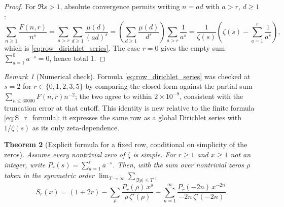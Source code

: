 \documentclass[11pt]{amsart}
\numberwithin{equation}{section}
\theoremstyle{plain}
\newtheorem{theorem}{Theorem}[section]
\theoremstyle{definition}
\theoremstyle{remark}
\newtheorem{remark}[theorem]{Remark}
\newcommand{\mob}{\mu}
\newcommand{\zetaR}{\zeta}
\newcommand{\Fsurf}{F}
\begin{document}
\begin{proof}
For \(\Re s>1\), absolute convergence permits writing \(n=ad\) with \(a>r\), \(d\ge1\):
\begin{equation}
\sum_{n\ge1}\frac{\Fsurf(n,r)}{n^s}
=\sum_{a>r}\sum_{d\ge1}\frac{\mob(d)}{(ad)^s}
=\left(\sum_{d\ge1}\frac{\mob(d)}{d^s}\right)\sum_{a>r}\frac1{a^s}
=\frac1{\zetaR(s)}\left(\zetaR(s)-\sum_{a=1}^r\frac1{a^s}\right),
\label{eq:row_dirichlet_proof}
\end{equation}
which is \eqref{eq:row_dirichlet_series}.  The case \(r=0\) gives the empty sum \(\sum_{a=1}^0a^{-s}=0\), hence total \(1\).
\end{proof}

\begin{remark}[Numerical check]
\label{rem:row_dirichlet_numeric}
Formula \eqref{eq:row_dirichlet_series} was checked at \(s=2\) for \(r\in\{0,1,2,3,5\}\) by comparing the closed form against the partial sum \(\sum_{n\le30000}\Fsurf(n,r)n^{-2}\); the two agree to within \(2\times10^{-8}\), consistent with the truncation error at that cutoff.  This identity is new relative to the finite formula \eqref{eq:S_r_formula}: it expresses the same row as a global Dirichlet series with \(1/\zetaR(s)\) as its only zeta-dependence.
\end{remark}

\begin{theorem}[Explicit formula for a fixed row, conditional on simplicity of the zeros]
\label{thm:explicit_formula_Sr}
Assume every nontrivial zero of \(\zetaR\) is simple.  For \(r\ge1\) and \(x\ge1\) not an integer, write \(P_r(s)=\sum_{a=1}^r a^{-s}\).  Then, with the sum over nontrivial zeros \(\rho\) taken in the symmetric order \(\lim_{T\to\infty}\sum_{|\Im\rho|\le T}\),
\begin{equation}
S_r(x)=(1+2r)-\sum_{\rho}\frac{P_r(\rho)\,x^\rho}{\rho\,\zetaR'(\rho)}-\sum_{n=1}^\infty\frac{P_r(-2n)\,x^{-2n}}{-2n\,\zetaR'(-2n)}.
\label{eq:explicit_formula_Sr}
\end{equation}
\end{theorem}
\end{document}
